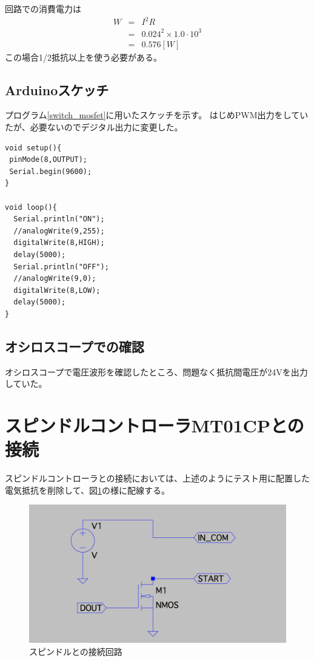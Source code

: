 \documentclass[]{jsarticle}
\begin{document}
回路での消費電力は
\begin{eqnarray*}
W & = &  I^{2} R \\
            & = & 0.024^{2} \times 1.0 \cdot 10^{3} \\
            & = & 0.576 [W]
\end{eqnarray*}
この場合1/2抵抗以上を使う必要がある。

\subsection{Arduinoスケッチ}
プログラム\ref{switch_mosfet}に用いたスケッチを示す。
はじめPWM出力をしていたが、必要ないのでデジタル出力に変更した。
\begin{lstlisting}[caption=MOSFET駆動スケッチ,label=switch_mosfet]
void setup(){
 pinMode(8,OUTPUT); 
 Serial.begin(9600);
}

void loop(){
  Serial.println("ON");
  //analogWrite(9,255);
  digitalWrite(8,HIGH);
  delay(5000);
  Serial.println("OFF");
  //analogWrite(9,0);
  digitalWrite(8,LOW);
  delay(5000);  
}
\end{lstlisting}

\subsection{オシロスコープでの確認}
オシロスコープで電圧波形を確認したところ、問題なく抵抗間電圧が24Vを出力していた。

\section{スピンドルコントローラMT01CPとの接続}
スピンドルコントローラとの接続においては、上述のようにテスト用に配置した電気抵抗を削除して、図\ref{controller}の様に配線する。
\begin{figure}[htbp]
\centering
\includegraphics[width=130mm]{./image/controller.pdf}
\caption{スピンドルとの接続回路}
\label{controller}
\end{figure}
\end{document}
